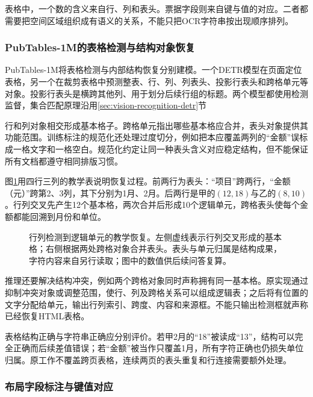 表格中，一个数的含义来自行、列和表头。票据字段则来自键与值的对应。二者都需要把空间区域组织成有语义的关系，不能只把OCR字符串按出现顺序排列。

\subsubsection{PubTables-1M的表格检测与结构对象恢复}
\label{sec:vision-understanding-pubtables}

PubTables-1M将表格检测与内部结构恢复分别建模。一个DETR模型在页面定位表格，另一个在裁剪表格中预测整表、行、列、列表头、投影行表头和跨格单元等对象。投影行表头是横跨其他列、用于划分后续行组的标题。两个模型都使用检测监督，集合匹配原理沿用\ref{sec:vision-recognition-detr}节

行和列对象相交形成基本格子。跨格单元指出哪些基本格应合并，表头对象提供其功能范围。训练标注的规范化还处理过度切分，例如把本应覆盖两列的“金额”误标成一格文字和一格空白。规范化约定让同一种表头含义对应稳定结构，但不能保证所有文档都遵守相同排版习惯。

图\ref{fig:vision-table-structure}用四行三列的教学表说明恢复过程。前两行为表头：“项目”跨两行，“金额（元）”跨第2、3列，其下分别为1月、2月。后两行是甲的$(12,18)$与乙的$(8,10)$。行列交叉先产生12个基本格，两次合并后形成10个逻辑单元，跨格表头使每个金额都能回溯到月份和单位。

\begin{figure}[htbp]
  \centering
  
  \caption{行列检测到逻辑单元的教学恢复。左侧虚线表示行列交叉形成的基本格；右侧根据两处跨格对象合并表头。表头与单元归属是结构成果，字符内容来自另行读取；图中的数值供后续问答复算。}
  \label{fig:vision-table-structure}
\end{figure}
\FloatBarrier

推理还要解决结构冲突，例如两个跨格对象同时声称拥有同一基本格。原实现通过抑制冲突对象或调整范围，使行、列及跨格关系可以组成逻辑表；之后将有位置的文字分配给单元，输出行列索引、跨度、内容和来源框。不能只输出检测框就声称已经恢复HTML表格。

表格结构正确与字符串正确应分别评价。若甲2月的“18”被读成“13”，结构可以完全正确而后续差值错误；若“金额”被当作只覆盖1月，所有字符正确也仍损失单位归属。原工作不覆盖跨页表格，连续两页的表头重复和行连接需要额外处理。

\subsubsection{布局字段标注与键值对应}
\label{sec:vision-understanding-fields}

